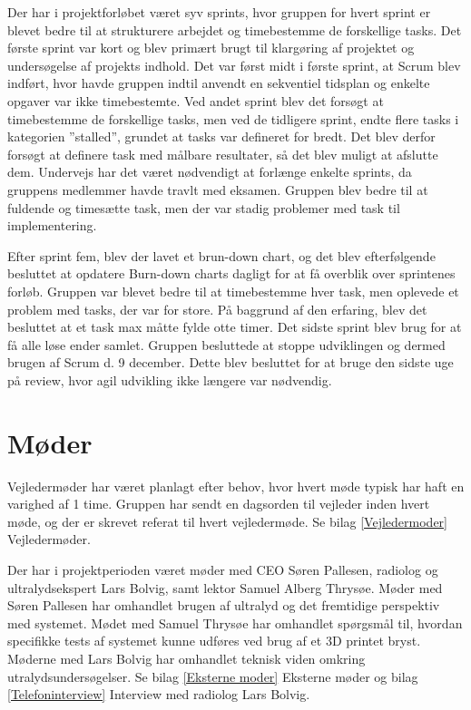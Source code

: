 Der har i projektforløbet været syv sprints, hvor gruppen for hvert sprint er blevet bedre til at strukturere arbejdet og timebestemme de forskellige tasks. Det første sprint var kort og blev primært brugt til klargøring af projektet og undersøgelse af projekts indhold. Det var først midt i første sprint, at Scrum blev indført, hvor havde gruppen indtil anvendt en sekventiel tidsplan og enkelte opgaver var ikke timebestemte. Ved andet sprint blev det forsøgt at timebestemme de forskellige tasks, men ved de tidligere sprint, endte flere tasks i kategorien ”stalled”, grundet at tasks var defineret for bredt. Det blev derfor forsøgt at definere task med målbare resultater, så det blev muligt at afslutte dem. Undervejs har det været nødvendigt at forlænge enkelte sprints, da gruppens medlemmer havde travlt med eksamen. Gruppen blev bedre til at fuldende og timesætte task, men der var stadig problemer med task til implementering. 

Efter sprint fem, blev der lavet et brun-down chart, og det blev efterfølgende besluttet at opdatere Burn-down charts dagligt for at få overblik over sprintenes forløb. Gruppen var blevet bedre til at timebestemme hver task, men oplevede et problem med tasks, der var for store. På baggrund af den erfaring, blev det besluttet at et task max måtte fylde otte timer. Det sidste sprint blev brug for at få alle løse ender samlet. Gruppen besluttede at stoppe udviklingen og dermed brugen af Scrum d. 9 december. Dette blev besluttet for at bruge den sidste uge på review, hvor agil udvikling ikke længere var nødvendig. 
 
\section{Møder}
Vejledermøder har været planlagt efter behov, hvor hvert møde typisk har haft en varighed af 1 time. Gruppen har sendt en dagsorden til vejleder inden hvert møde, og der er skrevet referat til hvert vejledermøde. Se bilag \ref{Vejledermoder} Vejledermøder.
 
Der har i projektperioden været møder med CEO Søren Pallesen, radiolog og ultralydsekspert Lars Bolvig, samt lektor Samuel Alberg Thrysøe. Møder med Søren Pallesen har omhandlet brugen af ultralyd og det fremtidige perspektiv med systemet. Mødet med Samuel Thrysøe har omhandlet spørgsmål til, hvordan specifikke tests af systemet kunne udføres ved brug af et 3D printet bryst. Møderne med Lars Bolvig har omhandlet teknisk viden omkring utralydsundersøgelser. Se bilag \ref{Eksterne moder} Eksterne møder og bilag \ref{Telefoninterview} Interview med radiolog Lars Bolvig. 

